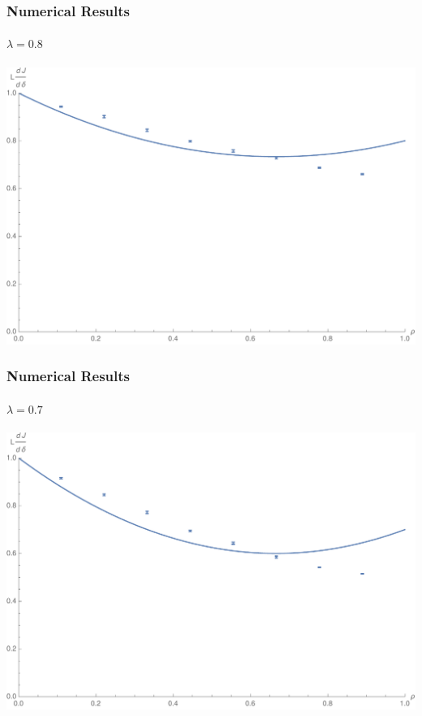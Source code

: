\documentclass{beamer}
\begin{document}
\begin{frame}
 \frametitle{Numerical Results}
 \framesubtitle{$\lambda = 0.8$}
 \begin{center}
  \includegraphics[width=0.9\linewidth]{images/lambda0p8}
 \end{center}
\end{frame}

\begin{frame}
 \frametitle{Numerical Results}
 \framesubtitle{$\lambda = 0.7$}
 \begin{center}
  \includegraphics[width=0.9\linewidth]{images/lambda0p7}
 \end{center}
\end{frame}
\end{document}
